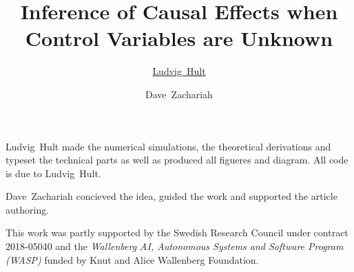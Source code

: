 \documentclass[accepted]{uai2021} %
\title{Inference of Causal Effects when Control Variables are Unknown}
\author[1]{\href{mailto:Ludvig~Hult<ludvig.hult@gmail.com>?Subject=Your UAI 2021 paper}{Ludvig~Hult}{}} %
\author[1]{Dave~Zachariah}
\affil[1]{%
    Systems and Control\\
    Uppsala Universitet\\
    Uppsala, Sweden
}
\theoremstyle{plain}
\theoremstyle{remark}
\begin{document}
\maketitle










\begin{contributions} %
Ludvig~Hult made the numerical simulations, the theoretical derivations and typeset the technical parts as well as produced all figueres and diagram.
All code is due to Ludvig~Hult.

Dave~Zachariah concieved the idea, guided the work and supported the article authoring.
\end{contributions}

\begin{acknowledgements} %
This work was partly supported by the Swedish Research Council under contract 2018-05040  and the \emph{Wallenberg AI, Autonomous Systems and Software Program (WASP)} funded by Knut and Alice Wallenberg Foundation.
\end{acknowledgements}


\end{document}
